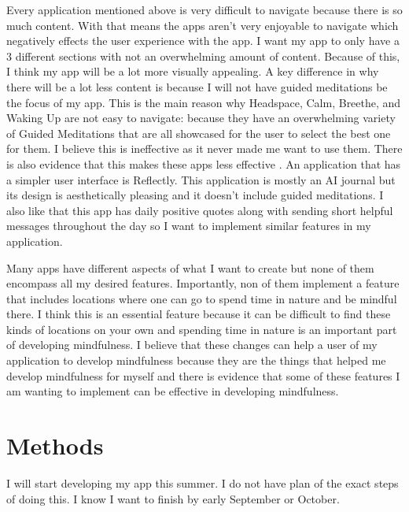 \documentclass[10pt,twocolumn]{article}
\begin{document}
Every application mentioned above is very difficult to navigate because there is so much content. With that means the apps aren't very enjoyable to navigate which negatively effects the user experience with the app. I want my app to only have a 3 different sections with not an overwhelming amount of content. Because of this, I think my app will be a lot more visually appealing. A key difference in why there will be a lot less content is because I will not have guided meditations be the focus of my app. This is the main reason why Headspace, Calm, Breethe, and Waking Up are not easy to navigate: because they have an overwhelming variety of Guided Meditations that are all showcased for the user to select the best one for them. I believe this is ineffective as it never made me want to use them. There is also evidence that this makes these apps less effective \cite{Eysenbach2015Review}. An application that has a simpler user interface is Reflectly. This application is mostly an AI journal but its design is aesthetically pleasing and it doesn't include guided meditations. I also like that this app has daily positive quotes along with sending short helpful messages throughout the day so I want to implement similar features in my application.

Many apps have different aspects of what I want to create but none of them encompass all my desired features. Importantly, non of them implement a feature that includes locations where one can go to spend time in nature and be mindful there. I think this is an essential feature because it can be difficult to find these kinds of locations on your own and spending time in nature is an important part of developing mindfulness. I believe that these changes can help a user of my application to develop mindfulness because they are the things that helped me develop mindfulness for myself and there is evidence that some of these features I am wanting to implement can be effective in developing mindfulness.

\section{Methods}
I will start developing my app this summer. I do not have plan of the exact steps of doing this. I know I want to finish by early September or October.
\end{document}
